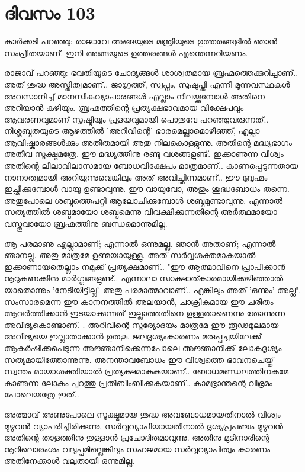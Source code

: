  
\section{ദിവസം 103}


കാര്‍ക്കടി പറഞ്ഞു: രാജാവേ അങ്ങയുടെ മന്ത്രിയുടെ ഉത്തരങ്ങളില്‍ ഞാന്‍ സംപ്രീതയാണ്‌. ഇനി അങ്ങയുടെ ഉത്തരങ്ങള്‍ എന്തെന്നറിയണം. 

രാജാവ്‌ പറഞ്ഞു: ഭവതിയുടെ ചോദ്യങ്ങള്‍ ശാശ്വതമായ ബ്രഹ്മത്തെക്കുറിച്ചാണ്‌.. അത്‌ ശുദ്ധ അസ്തിത്വമാണ്‌.. ജാഗ്രത്ത്‌, സ്വപ്നം, സുഷുപ്തി എന്നീ മൂന്നവസ്ഥകള്‍ അവസാനിച്ച്‌ മാനസീകവ്യാപാരങ്ങള്‍ എല്ലാം നിലയ്ക്കുമ്പോള്‍ അതിനെ അറിയാന്‍ കഴിയും. ബ്രഹ്മത്തിന്റെ പ്രത്യക്ഷഭാവമായ വിക്ഷേപവും ആവരണവുമാണ്‌ സൃഷ്ടിയും പ്രളയവുമായി പൊതുവേ പറഞ്ഞുവരുന്നത്‌.. നിശ്ശബ്ദതയുടെ ആഴത്തില്‍ 'അറിവിന്റെ' ഭാരമെല്ലാമൊഴിഞ്ഞ്‌, എല്ലാ ആവിഷ്കാരങ്ങള്‍ക്കും അതീതമായി അതു നിലകൊള്ളുന്നു. അതിന്റെ മദ്ധ്യഭാഗം അതീവ സൂക്ഷ്മമത്രേ. ഈ മദ്ധ്യത്തിനു രണ്ടു വശങ്ങളുണ്ട്‌.  ഇക്കാണുന്ന വിശ്വം അതിന്റെ ലീലാവിലാസമായ ബോധവിക്ഷേപം മാത്രമാണ്‌.. കാണപ്പെടുന്നതായ നാനാത്വമായി അറിയുന്നുവെങ്കിലും അത്‌ അവിച്ഛിന്നമാണ്‌.. ഈ ബ്രഹ്മം ഇച്ഛിക്കുമ്പോള്‍ വായു ഉണ്ടാവുന്നു. ഈ വായുവോ, അതും ശുദ്ധബോധം തന്നെ. അതുപോലെ ശബ്ദത്തെപറ്റി ആലോചിക്കുമ്പോള്‍ ശബ്ദമുണ്ടാവുന്നു. എന്നാല്‍ സത്യത്തില്‍ ശബ്ദമായോ ശബ്ദമെന്നു വിവക്ഷിക്കുന്നതിന്റെ അര്‍ത്ഥമായോ വസ്തുവായോ ബ്രഹ്മത്തിനു ബന്ധമൊന്നുമില്ല.

ആ പരമാണു എല്ലാമാണ്‌; എന്നാല്‍ ഒന്നുമല്ല. ഞാന്‍ അതാണ്‌; എന്നാല്‍ ഞാനല്ല. അതു മാത്രമേ ഉണ്മയായുള്ളു. അത്‌ സര്‍വ്വശക്തമാകയാല്‍ ഇക്കാണായതെല്ലാം നമുക്ക്‌ പ്രത്യക്ഷമാണ്‌.. "ഈ ആത്മാവിനെ പ്രാപിക്കാന്‍ നൂറുകണക്കിനു മാര്‍ഗ്ഗങ്ങളുണ്ട്‌.. എന്നാലാ സാക്ഷാത്കാരമായിക്കഴിഞ്ഞാല്‍ യാതൊന്നും 'നേടിയിട്ടില്ല'. അതു പരമാത്മാവാണ്‌.. എങ്കിലും അത്‌ 'ഒന്നും' അല്ല". സംസാരമെന്ന ഈ കാനനത്തില്‍ അലയാന്‍, ചാക്രികമായ ഈ ചരിതം ആവര്‍ത്തിക്കാന്‍ ഇടയാക്കുന്നത്‌ ഇല്ലാത്തതിനെ ഉള്ളതാണെന്നു തോന്നുന്ന അവിദ്യകൊണ്ടാണ്‌. . അറിവിന്റെ സൂര്യോദയം മാത്രമേ ഈ രൂഢമൂലമായ അവിദ്യയെ ഇല്ലാതാക്കാന്‍ ഉതകൂ. ജലദൃശ്യംകാരണം മരുപ്പച്ചയിലേക്ക്‌ ആകര്‍ഷിക്കപെടുന്ന അജ്ഞാനിക്കെന്നപോലെ അജ്ഞാനിക്ക്‌ ലോകദൃശ്യം സത്യമായിത്തോന്നുന്നു. അനന്താവബോധം ഈ വിശ്വത്തെ ഭാവനചെയ്ത്‌ സ്വന്തം മായാശക്തിയാല്‍ പ്രത്യക്ഷമാകുകയാണ്‌.. ബോധമണ്ഡലത്തിനകമേ കാണുന്ന ലോകം പുറത്തു പ്രതിബിംബിക്കുകയാണ്‌.. കാമഭ്രാന്തന്റെ വിഭ്രമം പോലെയത്രേ ഇത്‌..

അത്മാവ്‌ അണുപോലെ സൂക്ഷ്മമായ ശുദ്ധ അവബോധമായതിനാല്‍ വിശ്വം മുഴുവന്‍ വ്യാപരിച്ചിരിക്കുന്നു. സര്‍വ്വവ്യാപിയായതിനാല്‍ ദൃശ്യപ്രപഞ്ചം മുഴുവന്‍ അതിന്റെ താളത്തിനു തുള്ളാന്‍ പ്രചോദിതമാവുന്നു. അതിനു മുടിനാരിന്റെ നൂറിലൊരംശം വലുപ്പമില്ലെങ്കിലും സഹജമായ സര്‍വ്വവ്യാപിത്വം കാരണം അതിനേക്കാള്‍ വലുതായി ഒന്നുമില്ല.

